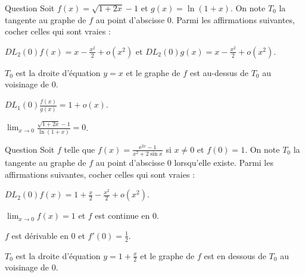 \begin{multi}[multiple,feedback=
{Les développements à l'ordre \(2\) en \(0\) de \((1+t)^{\alpha}\) et de \(\ln (1+x)\) donnent :
\[\displaystyle DL_2(0)f(x)=x-\frac{x^2}{2}+o(x^2)\quad \mbox{et}\quad DL_2(0)g(x)=x-\frac{x^2}{2}+o(x^2).\]
Donc \(T_0\) est la droite d'équation \(y=x\) et \(\displaystyle f(x)-y=-\frac{x^2}{2}+o(x^2)\leq 0\) au voisinage de \(0\) : le graphe de \(f\) est en dessous de \(T_0\) au voisinage de \(0\). A partir des \(DL_2(0)\) de \(f\) et \(g\), on obtient 
\[ DL_1(0)\frac{f(x)}{g(x)}=1+o(x)\Rightarrow \lim _{x\to 0}\frac{\sqrt{1+2x}-1}{\ln (1+x)}=1.\]
}]{Question}
Soit \(\displaystyle f(x)=\sqrt{1+2x}-1\) et \(g(x)=\ln (1+x)\). On note \(T_0\) la tangente au graphe de \(f\) au point d'abscisse \(0\). Parmi les affirmations suivantes, cocher celles qui sont vraies :

    \item* \(\displaystyle DL_2(0)f(x)=x-\frac{x^2}{2}+o(x^2)\) et \(\displaystyle DL_2(0)g(x)=x-\frac{x^2}{2}+o(x^2)\).
    \item \(T_0\) est la droite d'équation \(y=x\) et le graphe de \(f\) est au-dessus de \(T_0\) au voisinage de \(0\).
    \item* \(\displaystyle DL_1(0)\frac{f(x)}{g(x)}=1+o(x)\).
    \item \(\displaystyle \lim _{x\to 0}\frac{\sqrt{1+2x}-1}{\ln (1+x)}=0\).
\end{multi}


\begin{multi}[multiple,feedback=
{Pour écrire le \(DL_2(0)f(x)\), on utilise le \(DL_3(0)(\mathrm{e}^{2x}-1)\) et le \(DL_3(0)(x^2+2\sin x)\). La division suivant les puissances croissantes donne :
\[\displaystyle DL_2(0)f(x)=1+\frac{x}{2}+\frac{7x^2}{6}+o(x^2).\]
Ainsi \(\displaystyle \lim _{x\to 0}f(x)=1\) et \(f\) est continue en \(0\) et, puisque \(f\) admet un \(DL_1(0)\), \(f\) est dérivable en \(0\). De plus, \(T_0\) est la droite d'équation \(\displaystyle y=1+\frac{x}{2}\) et puisque \(\displaystyle f(x)-y=\frac{7x^2}{6}+o(x^2)\geq 0\) au voisinage de \(0\) : le graphe de \(f\) est au dessus de \(T_0\) au voisinage de \(0\).
}]{Question}
Soit \(f\) telle que \(\displaystyle f(x)=\frac{\mathrm{e}^{2x}-1}{x^2+2\sin x}\) si \(x\neq 0\) et \(f(0)=1\). On note \(T_0\) la tangente au graphe de \(f\) au point d'abscisse \(0\) lorsqu'elle existe. Parmi les affirmations suivantes, cocher celles qui sont vraies :

    \item \(\displaystyle DL_2(0)f(x)=1+\frac{x}{2}-\frac{x^2}{2}+o(x^2)\).
    \item* \(\displaystyle \lim _{x\to 0}f(x)=1\) et \(f\) est continue en \(0\).
    \item* \(f\) est dérivable en \(0\) et \(\displaystyle f'(0)=\frac{1}{2}\).
    \item \(T_0\) est la droite d'équation \(\displaystyle y=1+\frac{x}{2}\) et le graphe de \(f\) est en dessous de \(T_0\) au voisinage de \(0\).
\end{multi}


